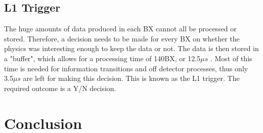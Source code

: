 \documentclass[12 pt]{article}
\begin{document}
		\subsection{L1 Trigger}
			The huge amounts of data produced in each BX cannot all be processed or stored. Therefore, a decision needs to be made for every BX on whether the physics was interesting enough to keep the data or not. The data is then stored in a "buffer", which allows for a processing time of 140BX, or 12.5$\mu s$ \cite{TDR}. Most of this time is needed for information transitions and off detector processes, thus only 3.5$\mu s$ are left for making this decision. This is known as the L1 trigger. 
			The required outcome is a Y/N decision. 
	\section{Conclusion}

	
	{}
\end{document}
